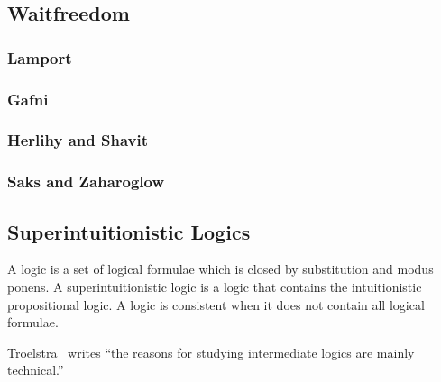 \subsection{Waitfreedom}

\subsubsection{Lamport}

\subsubsection{Gafni}

\subsubsection{Herlihy and Shavit}

\subsubsection{Saks and Zaharoglow}

\subsection{Superintuitionistic Logics}

A logic is a set of logical formulae which is closed by
substitution and modus ponens.
 A superintuitionistic logic is a logic
that contains the intuitionistic propositional logic.  A logic is consistent when it does not
contain all logical formulae.

Troelstra~\cite[p.~223]{goedelcollected} writes ``the reasons
for studying intermediate logics are mainly technical.''


